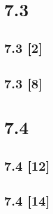 \documentclass{article}
\begin{document}
\newpage

\section*{7.3}
\setcounter{equation}{0}

\subsection*{7.3 [2]}
\subsection*{7.3 [8]}

\newpage

\section*{7.4}
\setcounter{equation}{0}

\subsection*{7.4 [12]}
\subsection*{7.4 [14]}
\end{document}
